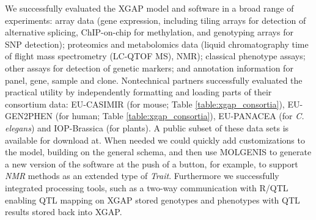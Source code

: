 We successfully evaluated the XGAP model and software in a broad range of experiments: array data (gene expression, including tiling arrays for detection of alternative splicing, ChIP-on-chip for methylation, and genotyping arrays for SNP detection); proteomics and metabolomics data (liquid chromatography time of flight mass spectrometry (LC-QTOF MS), NMR); classical phenotype assays\cite{Heap_2009, Bystrykh_2005, Li_2006, Keurentjes_2006, Stranger_2007b, Myers_2007, Bailey_2008, Beamer_1999}; other assays for detection of genetic markers; and annotation information for panel, gene, sample and clone.
Nontechnical partners successfully evaluated the practical utility by independently formatting and loading parts of their consortium data: EU-CASIMIR (for mouse; Table \ref{table:xgap_consortia}), EU-GEN2PHEN (for human; Table \ref{table:xgap_consortia}), EU-PANACEA (for \textsl{C. elegans}) and IOP-Brassica (for plants).
A public subset of these data sets is available for download at\cite{xgap_url}.
When needed we could quickly add customizations to the model, building on the general schema, and then use MOLGENIS to generate a new version of the software at the push of a button, for example, to support \textsl{NMR} methods as an extended type of \textsl{Trait}\cite{Fu_2009}.
Furthermore we successfully integrated processing tools, such as a two-way communication with R/QTL\cite{Broman_2003} enabling QTL mapping on XGAP stored genotypes and phenotypes with QTL results stored back into XGAP.

\linespread{1.00} %

